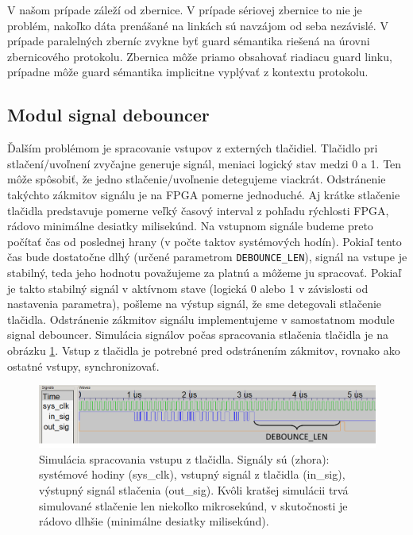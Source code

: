 V našom prípade záleží od zbernice. V prípade sériovej zbernice to nie je problém, nakoľko dáta prenášané na linkách sú navzájom od seba nezávislé. V prípade paralelných zberníc zvykne byť guard sémantika riešená na úrovni zbernicového protokolu. Zbernica môže priamo obsahovať riadiacu guard linku, prípadne môže guard sémantika implicitne vyplývať z kontextu protokolu.

\subsection{Modul signal debouncer} \label{subsek:debouncer}
Ďalším problémom je spracovanie vstupov z externých tlačidiel. Tlačidlo pri stlačení/uvoľnení zvyčajne generuje  signál, meniaci logický stav medzi 0 a 1. Ten môže spôsobiť, že jedno stlačenie/uvoľnenie detegujeme viackrát. Odstránenie takýchto zákmitov signálu je na FPGA pomerne jednoduché. Aj krátke stlačenie tlačidla predstavuje pomerne veľký časový interval z pohľadu rýchlosti FPGA, rádovo minimálne desiatky milisekúnd. Na vstupnom signále budeme preto počítať čas od poslednej hrany (v počte taktov systémových hodín). Pokiaľ tento čas bude dostatočne dlhý (určené parametrom \texttt{DEBOUNCE\_LEN}), signál na vstupe je stabilný, teda jeho hodnotu považujeme za platnú a môžeme ju spracovať. Pokiaľ je takto stabilný signál v aktívnom stave (logická 0 alebo 1 v závislosti od nastavenia parametra), pošleme na výstup signál, že sme detegovali stlačenie tlačidla. Odstránenie zákmitov signálu implementujeme v samostatnom module signal debouncer. Simulácia signálov počas spracovania stlačenia tlačidla je na obrázku \ref{obr:debouncerSim}. Vstup z tlačidla je potrebné pred odstránením zákmitov, rovnako ako ostatné vstupy, synchronizovať.

\begin{figure}
    \centerline{\includegraphics[width=1\textwidth]{images/simulations/debouncerSim.png}}
    \caption[Simulácia spracovania vstupu z tlačidla]{Simulácia spracovania vstupu z tlačidla. Signály sú (zhora): systémové hodiny (sys\_clk), vstupný signál z tlačidla (in\_sig), výstupný signál stlačenia (out\_sig). Kvôli kratšej simulácii trvá simulované stlačenie len niekoľko mikrosekúnd, v skutočnosti je rádovo dlhšie (minimálne desiatky milisekúnd).}
    \label{obr:debouncerSim}
\end{figure}

